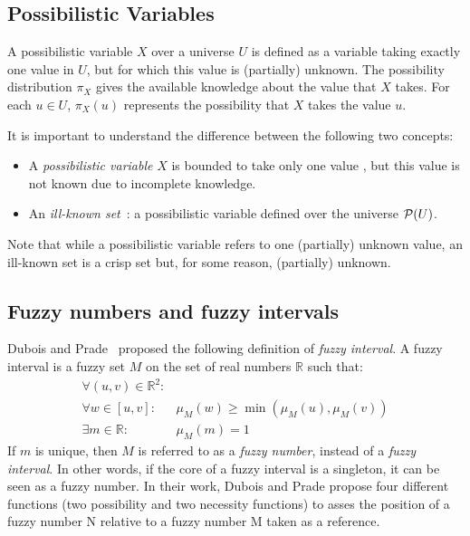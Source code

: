 



\subsection{Possibilistic Variables}
A possibilistic variable $X$ over a universe $U$ is defined as a variable taking exactly one value in $U$, but for which this value is (partially) unknown. The possibility distribution $\pi_X$ gives the available knowledge about the value that $X$ takes. For each $u\in U$, $\pi_X(u)$ represents the possibility that $X$ takes the value $u$.

It is important to understand the difference between the following two concepts:
\begin{itemize}
\item
A \emph{possibilistic variable} $X$ is bounded to take only one value , but this value is not known due to incomplete knowledge. 
\item
An \emph{ill-known set}~\cite{Dubois88b}: a possibilistic variable defined over the universe $\mathcal{P}(U)$.
\end{itemize}

Note that while a possibilistic variable refers to one (partially) unknown value, an ill-known set is a crisp set but, for some reason, (partially) unknown.


\subsection{\label{subsec:fuzzy-numbers}Fuzzy numbers and fuzzy intervals}
Dubois and Prade~\cite{Dubois1983} proposed the following definition of \emph{fuzzy interval}.
A fuzzy interval is a fuzzy set $M$ on the set of real numbers $\mathbb{R}$ such that:
\begin{eqnarray}
\forall (u,v)\in\mathbb{R}^2:&\\
\nonumber
\forall w \in [u,v]:&\mu_M(w) \geq\min(\mu_M(u),\mu_M(v))  \\
\exists m \in \mathbb{R}:& \mu_M(m)=1 
\end{eqnarray}
If $m$ is unique, then $M$ is referred to as a \emph{fuzzy number}, instead of a \emph{fuzzy interval}. In other words, if the core of a fuzzy interval is a singleton, it can be seen as a fuzzy number. In their work, Dubois and Prade propose four different functions (two possibility and two necessity functions) to asses the position of a fuzzy number N relative to  a fuzzy number M taken as a reference.

